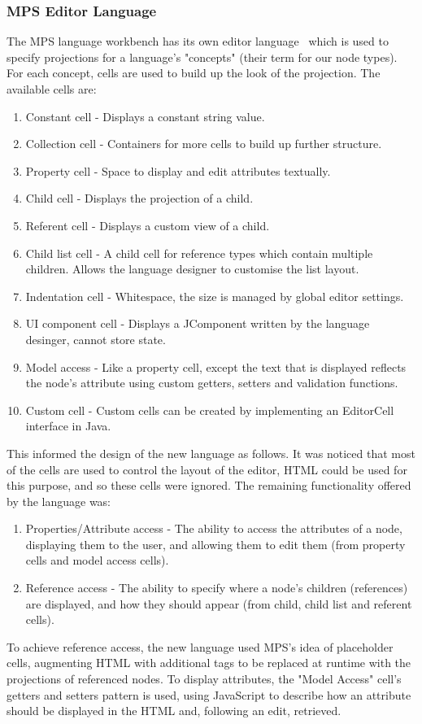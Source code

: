\documentclass{article}
\begin{document}
{\subsubsection{MPS Editor Language}
The MPS language workbench has its own editor language~\cite{mpsEditorLanguage} which is used to specify projections for a language's "concepts" (their term for our node types). For each concept, cells are used to build up the look of the projection. The available cells are:
\begin{enumerate}
\item Constant cell - Displays a constant string value.
\item Collection cell - Containers for more cells to build up further structure.
\item Property cell - Space to display and edit attributes textually.
\item Child cell - Displays the projection of a child.
\item Referent cell - Displays a custom view of a child.
\item Child list cell - A child cell for reference types which contain multiple children. Allows the language designer to customise the list layout.
\item Indentation cell - Whitespace, the size is managed by global editor settings.
\item UI component cell - Displays a JComponent written by the language desinger, cannot store state.
\item Model access - Like a property cell, except the text that is displayed reflects the node's attribute using custom getters, setters and validation functions.
\item Custom cell - Custom cells can be created by implementing an EditorCell interface in Java.
\end{enumerate}
%
This informed the design of the new language as follows. It was noticed that most of the cells are used to control the layout of the editor, HTML could be used for this purpose, and so these cells were ignored. The remaining functionality offered by the language was:
\begin{enumerate}
\item Properties/Attribute access - The ability to access the attributes of a node, displaying them to the user, and allowing them to edit them  (from property cells and model access cells).
\item Reference access - The ability to specify where a node's children (references) are displayed, and how they should appear (from child, child list and referent cells).
\end{enumerate}
To achieve reference access, the new language used MPS's idea of placeholder cells, augmenting HTML with additional tags to be replaced at runtime with the projections of referenced nodes. To display attributes, the "Model Access" cell's getters and setters pattern is used, using JavaScript to describe how an attribute should be displayed in the HTML and, following an edit, retrieved. 

}
\end{document}
